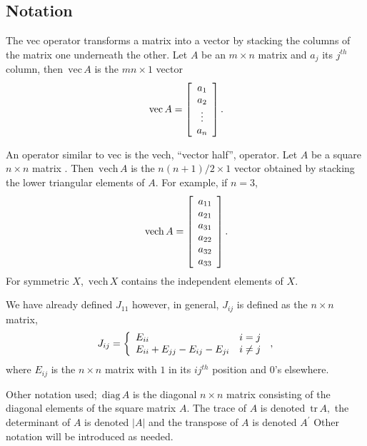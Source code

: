 \documentclass[12pt]{article}
\begin{document}
\subsection{Notation}

The vec operator transforms a matrix into a vector by stacking the columns of
the matrix one underneath the other. Let $A$ be an $m\times n$ matrix and
$a_{j}$ its $j^{th}$ column, then $\,\mathrm{vec}\,A$ is the $mn\times1$
vector
\begin{equation}
\,\mathrm{vec}\,A=\left[
\begin{array}
[c]{c}%
a_{1}\\
a_{2}\\
\vdots\\
a_{n}%
\end{array}
\right]  .
\end{equation}

An operator similar to vec is the vech, ``vector half'', operator. Let $A$ be
a square $n\times n$ matrix . Then $\,\mathrm{vech}\,A$ is the $n\left(
n+1\right)  /2\times1$ vector obtained by stacking the lower triangular
elements of $A$. For example, if $n=3$,
\begin{equation}
\,\mathrm{vech}\,A=\left[
\begin{array}
[c]{c}%
a_{11}\\
a_{21}\\
a_{31}\\
a_{22}\\
a_{32}\\
a_{33}%
\end{array}
\right]  .
\end{equation}
For symmetric $X$, $\,\mathrm{vech}\,X$ contains the independent elements of
$X$.

We have already defined $J_{11}$ however, in general, $J_{ij}$ is defined as
the $n\times n$ matrix,
\begin{equation}
J_{ij}=\left\{
\begin{array}
[c]{ll}%
E_{ii} & i=j\\
E_{ii}+E_{jj}-E_{ij}-E_{ji} & i\neq j
\end{array}
\right.  \,,\label{Jij}%
\end{equation}
where $E_{ij}$ is the $n\times n$ matrix with $1$ in its $ij^{th}$ position
and $0$'s elsewhere.

Other notation used; $\,\mathrm{diag}\,A$ is the diagonal $n\times n$ matrix
consisting of the diagonal elements of the square matrix $A.$ The trace of $A
$ is denoted $\,\mathrm{tr}\,A,$ the determinant of $A$ is denoted $|A|$ and
the transpose of $A$ is denoted $A^{\prime}$ Other notation will be introduced
as needed.
\end{document}
